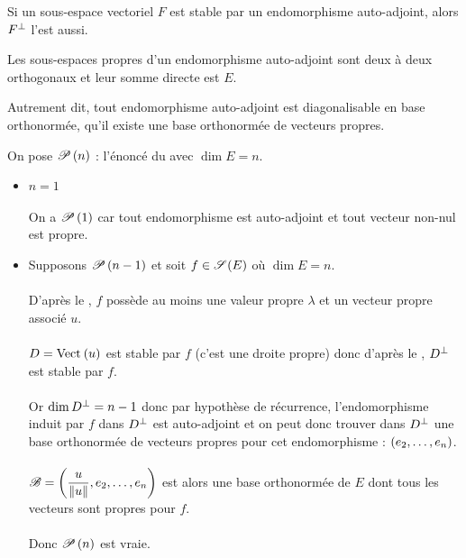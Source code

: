 \begin{lem}
Si un sous-espace vectoriel \(F\) est stable par un endomorphisme auto-adjoint, alors \(F\ortho\) l'est aussi.
\end{lem}

\begin{theo}
Les sous-espaces propres d'un endomorphisme auto-adjoint sont deux à deux orthogonaux et leur somme directe est \(E\).

Autrement dit, tout endomorphisme auto-adjoint est diagonalisable en base orthonormée, \cad qu'il existe une base orthonormée de vecteurs propres.
\end{theo}

\begin{dem}
On pose \(\P{n}\) : l'énoncé du  avec \(\dim E=n\).

\begin{itemize}
    \item \(n=1\) \\\\ On a \(\P{1}\) car tout endomorphisme est auto-adjoint et tout vecteur non-nul est propre. \\
    \item Supposons \(\P{n-1}\) et soit \(f\in\sym{}[E]\) où \(\dim E=n\). \\\\ D'après le , \(f\) possède au moins une valeur propre \(\lambda\) et un vecteur propre associé \(u\). \\\\ \(D=\Vect{u}\) est stable par \(f\) (c'est une droite propre) donc d'après le , \(D\ortho\) est stable par \(f\). \\\\ Or \(\dim D\ortho=n-1\) donc par hypothèse de récurrence, l'endomorphisme induit par \(f\) dans \(D\ortho\) est auto-adjoint et on peut donc trouver dans \(D\ortho\) une base orthonormée de vecteurs propres pour cet endomorphisme : \(\paren{e_2,\dots,e_n}\). \\\\ \(\fami{B}=\paren{\dfrac{u}{\norme{u}},e_2,\dots,e_n}\) est alors une base orthonormée de \(E\) dont tous les vecteurs sont propres pour \(f\). \\\\ Donc \(\P{n}\) est vraie.
\end{itemize}
\end{dem}

